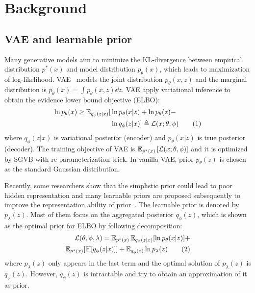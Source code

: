 \section{Background}

\subsection{VAE and learnable prior}

Many generative models aim to minimize the KL-divergence between empirical distribution $p^*(x)$ and model distribution $p_\theta(x)$, which leads to maximization of log-likelihood. VAE~\cite{kingma2014auto} models the joint distribution $p_\theta(x, z)$ and the marginal distribution is $p_\theta(x) = \int p_\theta(x, z) \dd z$. VAE apply variational inference to obtain the evidence lower bound objective (ELBO): 
\begin{align*} \label{eq:ELBO}
\ln p_\theta(x) \geq \operatorname{\mathbb{E}}_{q_\phi(z|x)} [  &  \ln p_\theta(x|z) + \ln p_\theta(z) - \\ & \ln q_\phi(z|x) ] 
\triangleq \mathcal{L}(x; \theta, \phi) \tag{1}
\end{align*}
where $q_\phi(z|x)$ is variational posterior (encoder) and $p_\theta(x|z)$ is true posterior (decoder). The training objective of VAE is $\operatorname{\mathbb{E}}_{{p^*(x)}}\left[{\mathcal{L}(x; \theta, \phi)}\right]$ and it is optimized by SGVB with re-parameterization trick. In vanilla VAE, prior $p_\theta(z)$ is chosen as the standard Gaussian distribution. 

Recently, some researchers show that the simplistic prior could lead to poor hidden representation and many learnable priors are proposed subsequently to improve the representation ability of prior~\cite{tomczak2018vae}. The learnable prior is denoted by $p_\lambda(z)$. Most of them focus on the aggregated posterior $q_\phi(z)$, which is shown as the optimal prior for ELBO by following decomposition:
\begin{align*} \label{eq:second-decomposition}
\mathcal{L}(\theta, \phi, \lambda) = \operatorname{\mathbb{E}}_{p^*(x)}\operatorname{\mathbb{E}}_{q_\phi(z|x)} [ \ln p_\theta(x|z)] + \\ 
\operatorname{\mathbb{E}}_{p^*(x)}[\mathbb{H}[q_\phi(z|x)]] + \operatorname{\mathbb{E}}_{q_\phi(z)} \ln p_\lambda(z) \tag{2}
\end{align*}
where $p_\lambda(z)$ only appears in the last term and the optimal solution of $p_\lambda(z)$ is $q_\phi(z)$. However, $q_\phi(z)$ is intractable and \cite{tomczak2018vae,takahashi2019variational} try to obtain an approximation of it as prior. 

